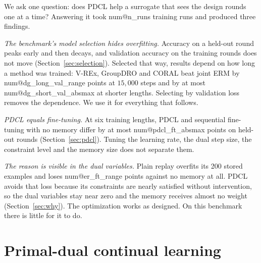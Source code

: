 \documentclass[10pt]{article}
\makeatletter
\newcommand{\num}[1]{\csname num@#1\endcsname}
\makeatother
\begin{document}
We ask one question: does PDCL help a surrogate that sees the design rounds one at a time? Answering it took \num{n_runs} training runs and produced three findings.

\emph{The benchmark's model selection hides overfitting.} Accuracy on a held-out round peaks early and then decays, and validation accuracy on the training rounds does not move (Section~\ref{sec:selection}). Selected that way, results depend on how long a method was trained: V-REx, GroupDRO and CORAL beat joint ERM by \num{dg_long_val_range} points at $15{,}000$ steps and by at most \num{dg_short_val_absmax} at shorter lengths. Selecting by validation loss removes the dependence. We use it for everything that follows.

\emph{PDCL equals fine-tuning.} At six training lengths, PDCL and sequential fine-tuning with no memory differ by at most \num{pdcl_ft_absmax} points on held-out rounds (Section~\ref{sec:pdcl}). Tuning the learning rate, the dual step size, the constraint level and the memory size does not separate them.

\emph{The reason is visible in the dual variables.} Plain replay overfits its 200 stored examples and loses \num{er_ft_range} points against no memory at all. PDCL avoids that loss because its constraints are nearly satisfied without intervention, so the dual variables stay near zero and the memory receives almost no weight (Section~\ref{sec:why}). The optimization works as designed. On this benchmark there is little for it to do.

\section{Primal-dual continual learning}
\label{sec:method}
\end{document}
